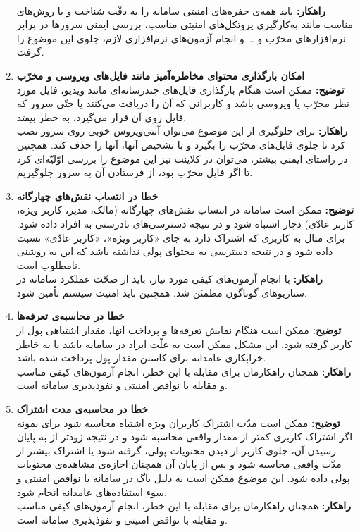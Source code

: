 \begin{enumerate}[start = 1]
       \\\textbf{راهکار: }
        باید همه‌ی حفره‌های  امنیتی سامانه را به دقّت شناخت و با روش‌های مناسب مانند به‌کارگیری پروتکل‌های امنیتی مناسب، بررسی ایمنی سرورها در برابر نرم‌افزارهای مخرّب و … و انجام آزمون‌های نرم‌افزاری لازم، جلوی این موضوع را گرفت.
        \item \textbf{امکان بارگذاری محتوای مخاطره‌آمیز مانند فایل‌های ویروسی و مخرّب}
       \\\textbf{توضیح: }
        ممکن است هنگام بارگذاری فایل‌های چندرسانه‌ای مانند ویدیو، فایل مورد نظر مخرّب یا ویروسی باشد و کاربرانی که آن را دریافت می‌کنند یا حتّی سرور که فایل روی آن قرار می‌گیرد، به خطر بیفتد.
       \\\textbf{راهکار: }
        برای جلوگیری از این موضوع می‌توان آنتی‌ویروس خوبی روی سرور نصب کرد تا جلوی فایل‌های مخرّب را بگیرد و با تشخیص آنها، آنها را حذف کند. همچنین در راستای ایمنی بیشتر، می‌توان در کلاینت نیز این موضوع را بررسی اوّلیّه‌ای کرد تا اگر فایل مخرّب بود، از فرستادن آن به سرور جلوگیریم.
    \item \textbf{خطا در انتساب نقش‌های چهارگانه}
       \\\textbf{توضیح: }
        ممکن است سامانه در انتساب نقش‌های چهارگانه (مالک، مدیر، کاربر ویژه، کاربر عادّی) دچار اشتباه شود و در نتیجه دسترسی‌های نادرستی به افراد داده شود. برای مثال به کاربری که اشتراک دارد به جای «کاربر ویژه»، «کاربر عادّی» نسبت داده شود و در نتیجه دسترسی به محتوای پولی نداشته باشد که این به روشنی نامطلوب است.
       \\\textbf{راهکار: }
        با انجام آزمون‌های کیفی مورد نیاز، باید از صحّت عملکرد سامانه در سناریوهای گوناگون مطمئن شد. همچنین باید امنیت سیستم تأمین شود.
    \item \textbf{خطا در محاسبه‌ی تعرفه‌ها}
       \\\textbf{توضیح: }
        ممکن است هنگام نمایش تعرفه‌ها و پرداخت آنها، مقدار اشتباهی پول از کاربر گرفته شود. این مشکل ممکن است به علّت ایراد در سامانه باشد یا به خاطر خرابکاری عامدانه برای کاستن مقدار پول پرداخت شده باشد.
       \\\textbf{راهکار: }
        همچنان راهکارمان برای مقابله با این خطر، انجام آزمون‌های کیفی مناسب و مقابله با نواقص امنیتی و نفوذپذیری سامانه است.
    \item \textbf{خطا در محاسبه‌ی مدت اشتراک}
       \\\textbf{توضیح: }
        ممکن است مدّت اشتراک کاربران ویژه اشتباه محاسبه شود برای نمونه اگر اشتراک کاربری کمتر از مقدار واقعی محاسبه شود و در نتیجه زودتر از به پایان رسیدن آن، جلوی کاربر از دیدن محتویات پولی، گرفته شود یا اشتراک بیشتر از مدّت واقعی محاسبه شود و پس از پایان آن همچنان اجازه‌ی مشاهده‌ی محتویات پولی داده شود. این موضوع ممکن است به دلیل باگ در سامانه یا نواقص امنیتی و سوء استفاده‌های عامدانه انجام شود.
       \\\textbf{راهکار: }
        همچنان راهکارمان برای مقابله با این خطر، انجام آزمون‌های کیفی مناسب و مقابله با نواقص امنیتی و نفوذپذیری سامانه است.
\end{enumerate}

